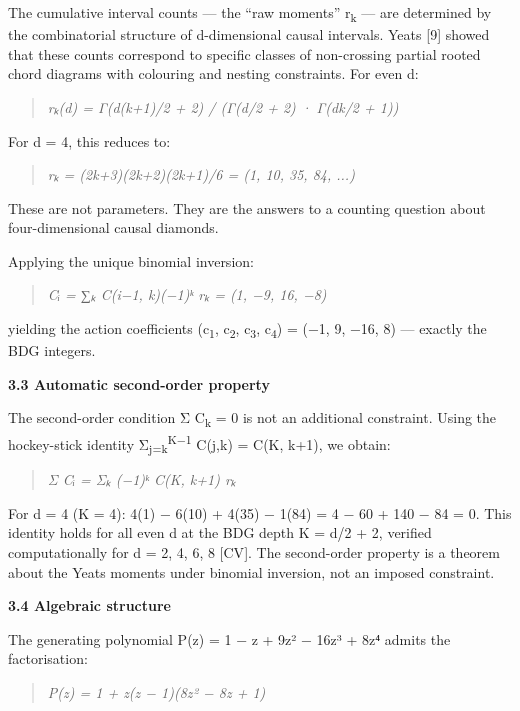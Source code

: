\documentclass[12pt,a4paper]{article}
\begin{document}
The cumulative interval counts --- the ``raw moments''
r\textsubscript{k} --- are determined by the combinatorial structure of
d-dimensional causal intervals. Yeats {[}9{]} showed that these counts
correspond to specific classes of non-crossing partial rooted chord
diagrams with colouring and nesting constraints. For even d:

\begin{quote}
\emph{rₖ(d) = Γ(d(k+1)/2 + 2) / (Γ(d/2 + 2) · Γ(dk/2 + 1))}
\end{quote}

For d = 4, this reduces to:

\begin{quote}
\emph{rₖ = (2k+3)(2k+2)(2k+1)/6 = (1, 10, 35, 84, ...)}
\end{quote}

These are not parameters. They are the answers to a counting question
about four-dimensional causal diamonds.

Applying the unique binomial inversion:

\begin{quote}
\emph{Cᵢ = ∑ₖ C(i−1, k)(−1)ᵏ rₖ = (1, −9, 16, −8)}
\end{quote}

yielding the action coefficients (c\textsubscript{1},
c\textsubscript{2}, c\textsubscript{3}, c\textsubscript{4}) = (−1, 9,
−16, 8) --- exactly the BDG integers.

\textbf{3.3 Automatic second-order property}

The second-order condition Σ C\textsubscript{k} = 0 is not an additional
constraint. Using the hockey-stick identity
Σ\textsubscript{j=k}\textsuperscript{K−1} C(j,k) = C(K, k+1), we obtain:

\begin{quote}
\emph{Σ Cᵢ = Σₖ (−1)ᵏ C(K, k+1) rₖ}
\end{quote}

For d = 4 (K = 4): 4(1) − 6(10) + 4(35) − 1(84) = 4 − 60 + 140 − 84 = 0.
This identity holds for all even d at the BDG depth K = d/2 + 2,
verified computationally for d = 2, 4, 6, 8 {[}CV{]}. The second-order
property is a theorem about the Yeats moments under binomial inversion,
not an imposed constraint.

\textbf{3.4 Algebraic structure}

The generating polynomial P(z) = 1 − z + 9z² − 16z³ + 8z⁴ admits the
factorisation:

\begin{quote}
\emph{P(z) = 1 + z(z − 1)(8z² − 8z + 1)}
\end{quote}
\end{document}
